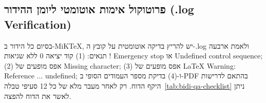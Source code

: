 \subsection{פרוטוקול אימות אוטומטי ליומן ההידור (\textenglish{.log Verification})}
בסיום כל הידור ב-\textenglish{MiKTeX}, יש להריץ בדיקה אוטומטית על קובץ ה-\textenglish{.log} ולאמת ארבעה תנאים: (1) קוד יציאה \textenglish{0} ללא שגיאות \textenglish{! Emergency stop} או \textenglish{Undefined control sequence}; (2) אפס מופעים של \textenglish{Missing character}; (3) אפס מופעים של \textenglish{LaTeX Warning: Reference ... undefined}; ו-(4) בדיקת מספר העמודים הסופי ב-\textenglish{PDF} בהתאם לדרישות היקף הדוח. רק לאחר מעבר מלא של כל 12 סעיפי טבלה~\ref{tab:bidi-qa-checklist} ניתן לאשר את הדוח להפצה.
